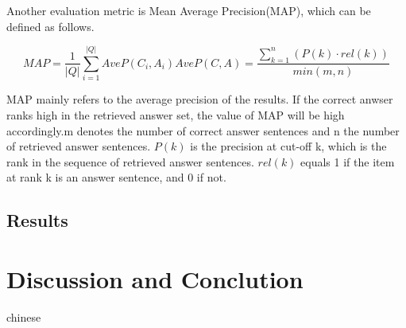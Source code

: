 \documentclass{llncs}
\begin{document}
Another evaluation metric is Mean Average Precision(MAP), which can be defined as follows.

\begin{equation}
MAP=\frac{1}{|Q|}\sum_{i=1}^|Q|AveP(C_{i},A_{i})

AveP(C,A)=\frac{\sum\nolimits_{k=1}^n(P(k)\cdot{rel(k)})}{min(m,n)}
\end{equation}

MAP mainly refers to the average precision of the results. If the correct anwser ranks high in the retrieved answer set, the value of MAP will be high accordingly.m denotes the number of correct answer sentences and n the number of retrieved answer sentences. $P(k)$ is the precision at cut-off k, which is the rank in the sequence of retrieved answer sentences. $rel(k)$ equals 1 if the item at rank k is an answer sentence, and 0 if not. 


\subsection{Results}


\section{Discussion and Conclution}
\label{sec:discussion}
chinese
\cite{Li2015Component}





%
%
%



\end{document}
